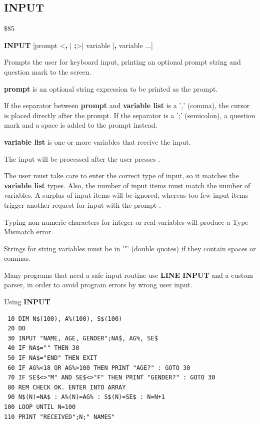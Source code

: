 \subsection{INPUT}
\begin{description}[leftmargin=2cm,style=nextline]
\item [Token:]    \$85

\item [Format:]   {\bf INPUT} [prompt <{\bf,} | {\bf;}>] variable [{\bf,} variable ...]

\item [Usage:]    Prompts the user for keyboard input, printing an optional prompt string and question mark to the screen.

                  {\bf prompt} is an optional string expression to be printed as the prompt.

                  If the separator between {\bf prompt} and {\bf variable list} is a ',' (comma), the cursor is placed directly after the prompt. If the separator is a ';' (semicolon), a question mark and a space is added to the prompt instead.

                  {\bf variable list} is one or more variables that receive the input.

                  The input will be processed after the user presses .

\item [Remarks:]  The user must take care to enter the correct type of input, so it matches the {\bf variable list} types. Also, the number of input items must match the number of variables. A surplus of input items will be ignored, whereas too few input items trigger another request for input with the prompt .
               
                  Typing non-numeric characters for integer or real variables will produce a Type Mismatch error.
                  
                  Strings for string variables must be in '"' (double quotes) if they contain spaces or commas.
               
                  Many programs that need a safe input routine use {\bf LINE INPUT} and a custom parser, in order to avoid program errors by wrong user input.

\item [Example:]  Using {\bf INPUT}

\begin{tcolorbox}[colback=black,coltext=white]
\verbatimfont{\codefont}
\begin{verbatim}
 10 DIM N$(100), A%(100), S$(100)
 20 DO
 30 INPUT "NAME, AGE, GENDER";NA$, AG%, SE$
 40 IF NA$="" THEN 30
 50 IF NA$="END" THEN EXIT
 60 IF AG%<18 OR AG%>100 THEN PRINT "AGE?" : GOTO 30
 70 IF SE$<>"M" AND SE$<>"F" THEN PRINT "GENDER?" : GOTO 30
 80 REM CHECK OK. ENTER INTO ARRAY
 90 N$(N)=NA$ : A%(N)=AG% : S$(N)=SE$ : N=N+1
100 LOOP UNTIL N=100
110 PRINT "RECEIVED";N;" NAMES"
\end{verbatim}
\end{tcolorbox}
\end{description}

